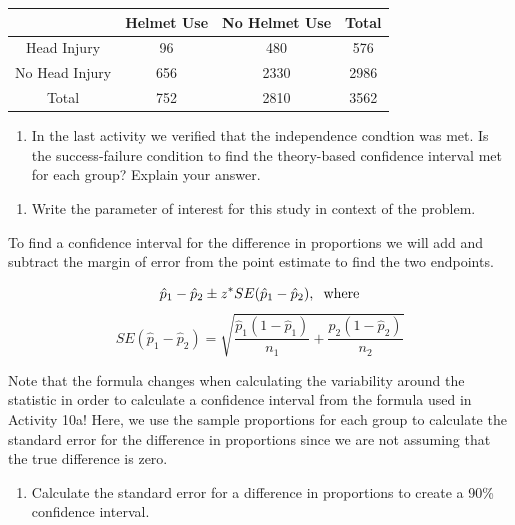 \documentclass[
]{report}
\providecommand{\tightlist}{%
  \setlength{\itemsep}{0pt}\setlength{\parskip}{0pt}}
\begin{document}
\begin{longtable}[]{@{}cccc@{}}
\toprule
& Helmet Use & No Helmet Use & Total \\
\midrule
\endhead
Head Injury & 96 & 480 & 576 \\
No Head Injury & 656 & 2330 & 2986 \\
Total & 752 & 2810 & 3562 \\
\bottomrule
\end{longtable}

\begin{enumerate}
\def\labelenumi{\arabic{enumi}.}
\setcounter{enumi}{1}
\tightlist
\item
  In the last activity we verified that the independence condtion was met. Is the success-failure condition to find the theory-based confidence interval met for each group? Explain your answer.
\end{enumerate}

\vspace{1in}

\begin{enumerate}
\def\labelenumi{\arabic{enumi}.}
\setcounter{enumi}{2}
\tightlist
\item
  Write the parameter of interest for this study in context of the problem.
\end{enumerate}

\vspace{0.8in}

To find a confidence interval for the difference in proportions we will add and subtract the margin of error from the point estimate to find the two endpoints.

\[\hat{p}_1-\hat{p}_2\pm z^*SE(\hat{p}_1-\hat{p}_2), \hspace{.2cm} \text{where}\]
\[SE(\hat{p}_1-\hat{p}_2) = \sqrt{\frac{\hat{p}_1 (1-\hat{p}_1)}{n_1}+\frac{\hat{p}_2 (1-\hat{p}_2)}{n_2}}\]

Note that the formula changes when calculating the variability around the statistic in order to calculate a confidence interval from the formula used in Activity 10a! Here, we use the sample proportions for each group to calculate the standard error for the difference in proportions since we are not assuming that the true difference is zero.

\begin{enumerate}
\def\labelenumi{\arabic{enumi}.}
\setcounter{enumi}{3}
\tightlist
\item
  Calculate the standard error for a difference in proportions to create a 90\% confidence interval.
\end{enumerate}
\end{document}
